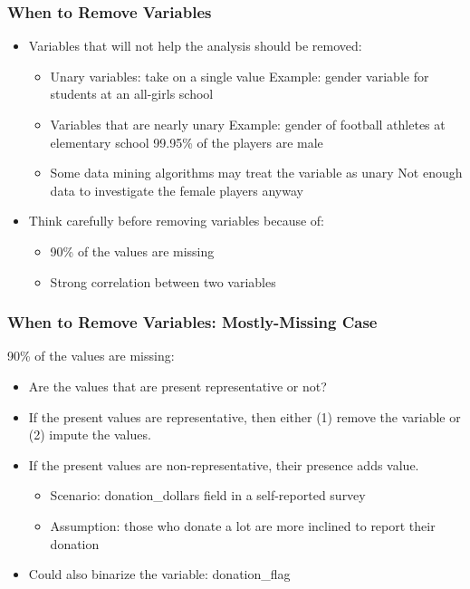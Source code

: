 \begin{frame}[fragile] \frametitle{When to Remove Variables}
\begin{itemize}
\item Variables that will not help the analysis should be removed:
	\begin{itemize}
	\item Unary variables: take on a single value Example: gender variable for students at an all-girls school
	\item Variables that are nearly unary Example: gender of football athletes at elementary school 99.95\% of the players are male
	\item Some data mining algorithms may treat the variable as unary Not enough data to investigate the female players anyway
	\end{itemize}
\item Think carefully before removing variables because of:
	\begin{itemize}
	\item 90\% of the values are missing
	\item Strong correlation between two variables
	\end{itemize}
\end{itemize}
\end{frame}


\begin{frame}[fragile] \frametitle{When to Remove Variables: Mostly-Missing Case}
90\% of the values are missing:
\begin{itemize}
\item Are the values that are present representative or not?
\item If the present values are representative, then either (1) remove the variable or (2) impute the values.
\item If the present values are non-representative, their presence adds value.
\begin{itemize}
\item Scenario: donation\_dollars field in a self-reported survey
\item Assumption: those who donate a lot are more inclined to report their donation
\end{itemize}
\item Could also binarize the variable: donation\_flag
\end{itemize}

\end{frame}


